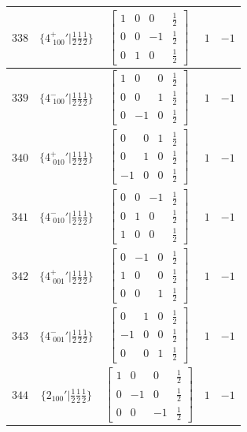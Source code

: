 \documentclass[fleqn,8pt]{jsarticle}
\begin{document}
\begin{longtable}{ccccc}
$ 338 $ & $ \{4^{+}_{\,\,100}{}'|\frac{1}{2} \frac{1}{2} \frac{1}{2}\} $ & $ \begin{bmatrix} 1 & 0 & 0 & \frac{1}{2} \\ 0 & 0 & -1 & \frac{1}{2} \\ 0 & 1 & 0 & \frac{1}{2} \end{bmatrix} $ & $ 1 $ & $ -1 $ \\ \hline
$ 339 $ & $ \{4^{-}_{\,\,100}{}'|\frac{1}{2} \frac{1}{2} \frac{1}{2}\} $ & $ \begin{bmatrix} 1 & 0 & 0 & \frac{1}{2} \\ 0 & 0 & 1 & \frac{1}{2} \\ 0 & -1 & 0 & \frac{1}{2} \end{bmatrix} $ & $ 1 $ & $ -1 $ \\ \hline
$ 340 $ & $ \{4^{+}_{\,\,010}{}'|\frac{1}{2} \frac{1}{2} \frac{1}{2}\} $ & $ \begin{bmatrix} 0 & 0 & 1 & \frac{1}{2} \\ 0 & 1 & 0 & \frac{1}{2} \\ -1 & 0 & 0 & \frac{1}{2} \end{bmatrix} $ & $ 1 $ & $ -1 $ \\ \hline
$ 341 $ & $ \{4^{-}_{\,\,010}{}'|\frac{1}{2} \frac{1}{2} \frac{1}{2}\} $ & $ \begin{bmatrix} 0 & 0 & -1 & \frac{1}{2} \\ 0 & 1 & 0 & \frac{1}{2} \\ 1 & 0 & 0 & \frac{1}{2} \end{bmatrix} $ & $ 1 $ & $ -1 $ \\ \hline
$ 342 $ & $ \{4^{+}_{\,\,001}{}'|\frac{1}{2} \frac{1}{2} \frac{1}{2}\} $ & $ \begin{bmatrix} 0 & -1 & 0 & \frac{1}{2} \\ 1 & 0 & 0 & \frac{1}{2} \\ 0 & 0 & 1 & \frac{1}{2} \end{bmatrix} $ & $ 1 $ & $ -1 $ \\ \hline
$ 343 $ & $ \{4^{-}_{\,\,001}{}'|\frac{1}{2} \frac{1}{2} \frac{1}{2}\} $ & $ \begin{bmatrix} 0 & 1 & 0 & \frac{1}{2} \\ -1 & 0 & 0 & \frac{1}{2} \\ 0 & 0 & 1 & \frac{1}{2} \end{bmatrix} $ & $ 1 $ & $ -1 $ \\ \hline
$ 344 $ & $ \{2{}_{100}{}'|\frac{1}{2} \frac{1}{2} \frac{1}{2}\} $ & $ \begin{bmatrix} 1 & 0 & 0 & \frac{1}{2} \\ 0 & -1 & 0 & \frac{1}{2} \\ 0 & 0 & -1 & \frac{1}{2} \end{bmatrix} $ & $ 1 $ & $ -1 $ \\ \hline

\end{longtable}
\end{document}
